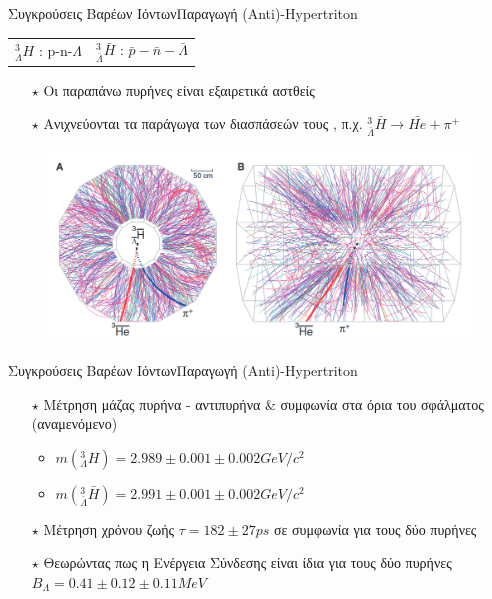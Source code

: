 \documentclass[18pt,notheorems,hyperref={pdfauthor=whatever}]{beamer}
\begin{document}
\begin{frame}{Συγκρούσεις Βαρέων Ιόντων}{Παραγωγή (Anti)-Hypertriton}
      \begin{table}[h!]
    \centering
    \begin{tabular}{cc}
       $^3_{\Lambda}H$ :  p-n-$\Lambda$ & $^3_{\bar{\Lambda}}\bar{H}$ :  $\bar{p}-\bar{n}-\bar{\Lambda}$
    \end{tabular}
\end{table}
    \begin{itemize}
        \item[$\star$] Οι παραπάνω πυρήνες είναι εξαιρετικά αστθείς 
        \item[$\star$] Ανιχνεύονται τα παράγωγα των διασπάσεών τους , π.χ. $^3_{\bar{\Lambda}}\bar{H}\rightarrow\bar{He} + \pi^+$\pause
    \end{itemize}

     
        \begin{figure}
            \centering
            \includegraphics[scale=0.4]{images/hypertriton_traj.png}
        \end{figure}
\end{frame}

\begin{frame}{Συγκρούσεις Βαρέων Ιόντων}{Παραγωγή (Anti)-Hypertriton}
            \begin{itemize}
                \item[$\star$] Μέτρηση μάζας πυρήνα - αντιπυρήνα \& συμφωνία στα όρια του σφάλματος (αναμενόμενο)
                    \begin{itemize}
                        \item  $m(^3_{\Lambda}H) = 2.989\pm0.001\pm0.002GeV/c^2$
                        \item  $m(^3_{\bar{\Lambda}}\bar{H}) = 2.991\pm0.001\pm0.002GeV/c^2$
                    \end{itemize}
                \item[$\star$] Μέτρηση χρόνου ζωής $\tau=182\pm27ps$ σε συμφωνία για τους δύο πυρήνες 
                \item[$\star$] Θεωρώντας πως η Ενέργεια Σύνδεσης είναι ίδια για τους δύο πυρήνες $B_\Lambda =0.41\pm0.12\pm0.11 MeV$
            \end{itemize}
        
        \end{frame}
\end{document}
